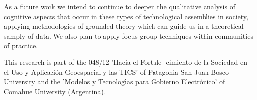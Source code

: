 \documentclass[10pt,twocolumn,ieeetran]{article}
\begin{document}


As a future work we intend to continue to deepen the qualitative analysis of cognitive aspects that occur in these types of technological assemblies in society, applying methodologies of grounded theory which can guide us in a theoretical samply of data. We also plan to apply focus group techniques within communities of practice.



\noindent This research is part of the 048/12 'Hacia el Fortale- cimiento de la Sociedad en el Uso y Aplicaci\' on Geoespacial y las TICS' of Patagonia San Juan Bosco University and the 'Modelos y Tecnolog\' {\i}as para Gobierno Electr\' onico' of Comahue University (Argentina).



\end{document}
